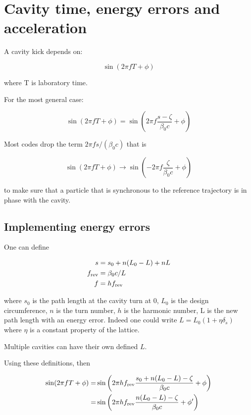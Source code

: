 \section{Cavity time, energy errors and acceleration}

A cavity kick depends on:

\begin{equation}
\sin(2 \pi f T + \phi)
\end{equation}

where T is laboratory time.


For the most general case:

\begin{equation}
\sin(2 \pi f T + \phi) = \sin\left(2 \pi f \frac{s-\zeta}{\beta_0 c}  + \phi \right)
\end{equation}

Most codes drop the term $2 \pi f s / (\beta_0 c)$ that is

\begin{equation}
\sin(2 \pi f T + \phi) \to  \sin\left(- 2 \pi f \frac{\zeta}{\beta_0 c} + \phi\right)
\end{equation}

to make sure that a particle that is synchronous to the reference trajectory is in phase with the cavity.


\subsection{Implementing energy errors}

One can define

\begin{equation}
\begin{aligned}
s &= s_0 + n (L_0-L) + n L\\
f_{\rm rev} &= \beta_0 c / L\\
f &= h f_{\rm rev}
\end{aligned}
\end{equation}

where $s_0$ is the path length at the cavity turn at 0, $L_0$ is the design circumference, $n$ is the turn number, $h$ is the harmonic number, L is the new path length with an energy error. Indeed one could write $L=L_0(1 +\eta \delta_s)$ where $\eta$ is a constant property of the lattice.

Multiple cavities can have their own defined $L$.

Using these definitions, then


\begin{align}
\sin(2 \pi f T + \phi) =
&\sin\left(2 \pi h f_{\rm rev} \frac{s_0 + n(L_0-L) -\zeta}{\beta_0 c}  + \phi\right)\\
=&\sin\left(2 \pi h f_{\rm rev} \frac{n(L_0-L) -\zeta}{\beta_0 c}  + \phi'\right)
\end{align}


